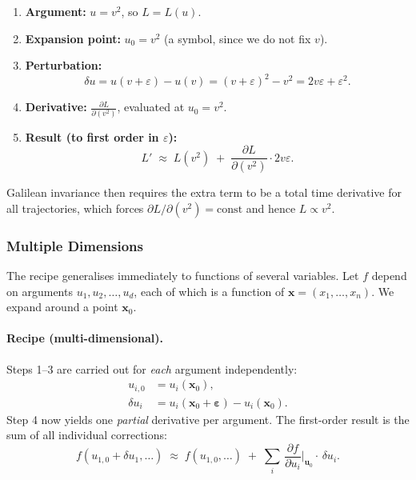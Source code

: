 \begin{enumerate}
	\item \textbf{Argument:} $u = v^2$, so $L = L(u)$.
	\item \textbf{Expansion point:} $u_0 = v^2$ (a symbol, since we do not
	fix $v$).
	\item \textbf{Perturbation:}
	\begin{equation}
		\delta u
		= u(v+\varepsilon) - u(v)
		= (v+\varepsilon)^2 - v^2
		= 2v\varepsilon + \varepsilon^2.
	\end{equation}
	\item \textbf{Derivative:} $\displaystyle\frac{\partial L}{\partial(v^2)}$,
	evaluated at $u_0 = v^2$.
	\item \textbf{Result (to first order in $\varepsilon$):}
	\begin{equation}
		L' \;\approx\; L(v^2) \;+\; \frac{\partial L}{\partial(v^2)}
		\cdot 2v\varepsilon.
	\end{equation}
\end{enumerate}

\noindent Galilean invariance then requires the extra term to be a total time
derivative for all trajectories, which forces
$\partial L/\partial(v^2) = \mathrm{const}$ and hence $L \propto v^2$.

\subsubsection*{Multiple Dimensions}

The recipe generalises immediately to functions of several variables.  Let
$f$ depend on arguments $u_1, u_2, \ldots, u_d$, each of which is a function
of $\boldsymbol{x} = (x_1, \ldots, x_n)$.  We expand around a point
$\boldsymbol{x}_0$.

\paragraph{Recipe (multi-dimensional).}

Steps 1--3 are carried out for \emph{each} argument independently:
\begin{align}
	u_{i,0} &= u_i(\boldsymbol{x}_0), \\
	\delta u_i &= u_i(\boldsymbol{x}_0 + \boldsymbol{\varepsilon})
	- u_i(\boldsymbol{x}_0).
\end{align}
Step 4 now yields one \emph{partial} derivative per argument.  The first-order
result is the sum of all individual corrections:
\begin{equation}
	\boxed{f(u_{1,0}+\delta u_1,\ldots) \;\approx\; f(u_{1,0},\ldots)
		\;+\; \sum_{i}\,\frac{\partial f}{\partial u_i}\bigg|_{\boldsymbol{u}_0}
		\cdot\,\delta u_i.}
	\label{eq:taylor_md_1}
\end{equation}

